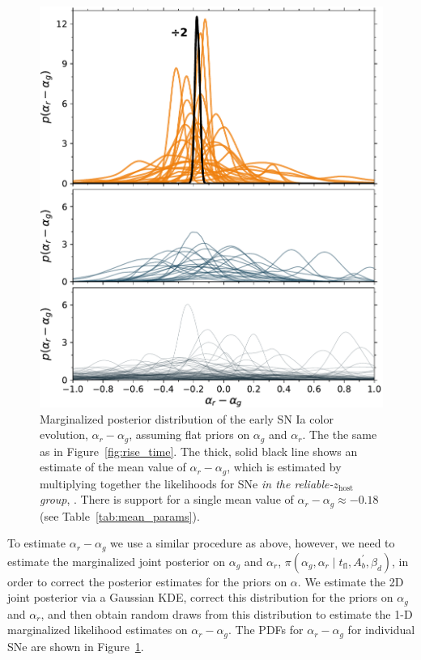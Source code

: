 \documentclass[twocolumn]{./aastex63}
\begin{document}
\begin{figure}
    \centering
    \includegraphics[width=1\linewidth]{./figures/delta.pdf}
    \caption{Marginalized posterior distribution of the early SN Ia color
    evolution, $\alpha_r - \alpha_g$, assuming flat priors on $\alpha_g$ and
    $\alpha_r$. The  the same as in
    Figure~\ref{fig:rise_time}. The thick, solid black line shows an estimate
    of the mean value of $\alpha_r - \alpha_g$, which is estimated by
    multiplying together the likelihoods for SNe \textit{in the
    reliable-$z_\mathrm{host}$ group}, .
    There is support for a single mean value of $\alpha_r - \alpha_g \approx
    -0.18$ (see Table~\ref{tab:mean_params}).}
    \label{fig:delta}
\end{figure}

To estimate $\alpha_r - \alpha_g$ we use a similar procedure as above,
however, we need to estimate the marginalized joint posterior on $\alpha_g$
and $\alpha_r$, $\pi(\alpha_g,\alpha_r \mid t_\mathrm{fl}, A^\prime_b,
\beta_d)$, in order to correct the posterior estimates for the priors on
$\alpha$. We estimate the 2D joint posterior via a Gaussian KDE, correct this
distribution for the priors on $\alpha_g$ and $\alpha_r$, and then obtain
random draws from this distribution to estimate the 1-D marginalized
likelihood estimates on $\alpha_r - \alpha_g$. The PDFs for $\alpha_r -
\alpha_g$ for individual SNe are shown in Figure~\ref{fig:delta}.
\end{document}

